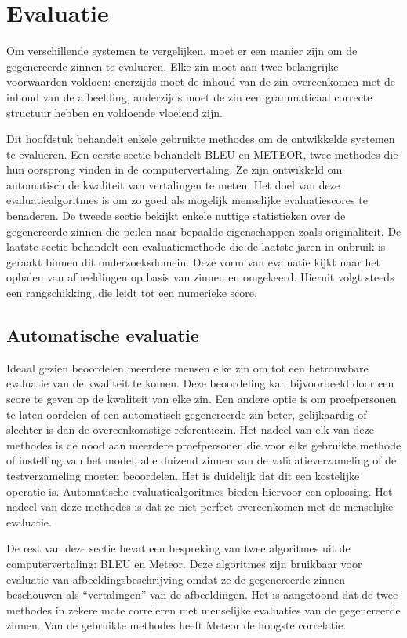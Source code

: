 \chapter{Evaluatie}
\label{hoofdstuk:evaluatie}
Om verschillende systemen te vergelijken, moet er een manier zijn om de gegenereerde zinnen te evalueren. Elke zin moet aan twee belangrijke voorwaarden voldoen: enerzijds moet de inhoud van de zin overeenkomen met de inhoud van de afbeelding, anderzijds moet de zin een grammaticaal correcte structuur hebben en voldoende vloeiend zijn.

Dit hoofdstuk behandelt enkele gebruikte methodes om de ontwikkelde systemen te evalueren. Een eerste sectie behandelt BLEU en METEOR, twee methodes die hun oorsprong vinden in de computervertaling. Ze zijn ontwikkeld om automatisch de kwaliteit van vertalingen te meten. Het doel van deze evaluatiealgoritmes is om zo goed als mogelijk menselijke evaluatiescores te benaderen. De tweede sectie bekijkt enkele nuttige statistieken over de gegenereerde zinnen die peilen naar bepaalde eigenschappen zoals originaliteit. De laatste sectie behandelt een evaluatiemethode die de laatste jaren in onbruik is geraakt binnen dit onderzoeksdomein. Deze vorm van evaluatie kijkt naar het ophalen van afbeeldingen op basis van zinnen en omgekeerd. Hieruit volgt steeds een rangschikking, die leidt tot een numerieke score.


\section{Automatische evaluatie}
Ideaal gezien beoordelen meerdere mensen elke zin om tot een betrouwbare evaluatie van de kwaliteit te komen. Deze beoordeling kan bijvoorbeeld door een score te geven op de kwaliteit van elke zin. Een andere optie is om proefpersonen te laten oordelen of een automatisch gegenereerde zin beter, gelijkaardig of slechter is dan de overeenkomstige referentiezin. Het nadeel van elk van deze methodes is de nood aan meerdere proefpersonen die voor elke gebruikte methode of instelling van het model, alle duizend zinnen van de validatieverzameling of de testverzameling moeten beoordelen. Het is duidelijk dat dit een kostelijke operatie is. Automatische evaluatiealgoritmes bieden hiervoor een oplossing. Het nadeel van deze methodes is dat ze niet perfect overeenkomen met de menselijke evaluatie.

De rest van deze sectie bevat een bespreking van twee algoritmes uit de computervertaling: BLEU\cite{Papineni2001} en Meteor\cite{Denkowski2007a}. Deze algoritmes zijn bruikbaar voor evaluatie van afbeeldingsbeschrijving omdat ze de gegenereerde zinnen beschouwen als ``vertalingen'' van de afbeeldingen. Het is aangetoond dat de twee methodes in zekere mate correleren met menselijke evaluaties van de gegenereerde zinnen. Van de gebruikte methodes heeft Meteor de hoogste correlatie\cite{Elliott2014}.

